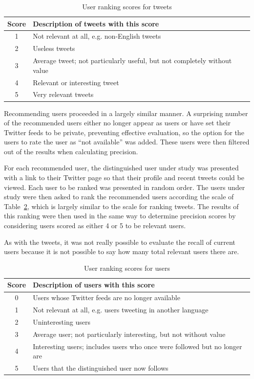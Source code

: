 \begin{table}
\centering
\begin{tabular}{c|l}
{\bf Score} & {\bf Description of tweets with this score} \\ \hline
1 & Not relevant at all, e.g. non-English tweets \\ \hline
2 & Useless tweets \\ \hline
3 & Average tweet; not particularly useful, but not completely without value \\ \hline
4 & Relevant or interesting tweet \\ \hline
5 & Very relevant tweets \\
\end{tabular}
\caption{User ranking scores for tweets}
\label{tab:UserRankingScoresForTweets}
\end{table}


Recommending users proceeded in a largely similar manner. A surprising number of the recommended users either no longer appear as users or have set their Twitter feeds to be private, preventing effective evaluation, so the option for the users to rate the user as ``not available'' was added. These users were then filtered out of the results when calculating precision.

For each recommended user, the distinguished user under study was presented with a link to their Twitter page so that their profile and recent tweets could be viewed. Each user to be ranked was presented in random order. The users under study were then asked to rank the recommended users according the scale of Table~\ref{tab:UserRankingScoresForUsers}, which is largely similar to the scale for ranking tweets. The results of this ranking were then used in the same way to determine precision scores by considering users scored as either 4 or 5 to be relevant users.

As with the tweets, it was not really possible to evaluate the recall of current users because it is not possible to say how many total relevant users there are.


\begin{table}
\centering
\begin{tabular}{c|l}
{\bf Score} & {\bf Description of users with this score} \\ \hline
0 & Users whose Twitter feeds are no longer available \\ \hline
1 & Not relevant at all, e.g. users tweeting in another language \\ \hline
2 & Uninteresting users \\ \hline
3 & Average user; not particularly interesting, but not without value \\ \hline
4 & Interesting users;  includes users who once were followed but no longer are \\ \hline
5 & Users that the distinguished user now follows \\
\end{tabular}
\caption{User ranking scores for users}
\label{tab:UserRankingScoresForUsers}
\end{table}


